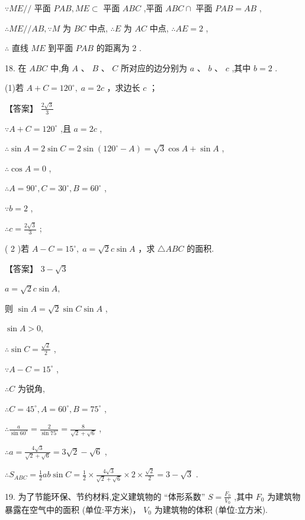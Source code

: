 \documentclass[10pt]{article}
\begin{document}
\(\because {ME}//\) 平面 \({PAB},{ME} \subset\) 平面 \({ABC}\) ,平面 \({ABC} \cap\) 平面 \({PAB} = {AB}\) ,

\(\therefore {ME}//{AB},\because M\) 为 \({BC}\) 中点, \(\therefore E\) 为 \({AC}\) 中点, \(\therefore {AE} = 2\) ,

\(\therefore\) 直线 \({ME}\) 到平面 \({PAB}\) 的距离为 2 .

18. 在 \({ABC}\) 中,角 \(A\text{ 、 }B\text{ 、 }C\) 所对应的边分别为 \(a\text{ 、 }b\text{ 、 }c\) ,其中 \(b = 2\) .

(1)若 \(A + C = {120}^{ \circ  },\;a = {2c}\) ，求边长 \(c\) ；

【答案】 \(\frac{2\sqrt{3}}{3}\)

\(\because A + C = {120}^{ \circ  }\) ,且 \(a = {2c}\) ,

\(\therefore \sin A = 2\sin C = 2\sin \left( {{120}^{ \circ  } - A}\right)  = \sqrt{3}\cos A + \sin A\) ,

\(\therefore \cos A = 0\) ,

\(\therefore A = {90}^{ \circ  },C = {30}^{ \circ  },B = {60}^{ \circ  }\) ,

\(\because b = 2\) ,

\(\therefore c = \frac{2\sqrt{3}}{3}\) ;

( 2 )若 \(A - C = {15}^{ \circ  },\;a = \sqrt{2}c\sin A\) ，求 \(\bigtriangleup  {ABC}\) 的面积.

【答案】 \(3 - \sqrt{3}\)

\(a = \sqrt{2}c\sin A,\)

则 \(\sin A = \sqrt{2}\sin C\sin A\) ,

\(\sin A > 0,\)

\(\therefore \sin C = \frac{\sqrt{2}}{2}\) ,

\(\because A - C = {15}^{ \circ  }\) ,

\(\therefore C\) 为锐角,

\(\therefore C = {45}^{ \circ  },A = {60}^{ \circ  },B = {75}^{ \circ  }\) ,

\(\therefore \frac{a}{\sin {60}^{ \circ  }} = \frac{2}{\sin {75}^{ \circ  }} = \frac{8}{\sqrt{2} + \sqrt{6}}\) ,

\(\therefore a = \frac{4\sqrt{3}}{\sqrt{2} + \sqrt{6}} = 3\sqrt{2} - \sqrt{6}\) ,

\(\therefore {S}_{ABC} = \frac{1}{2}{ab}\sin C = \frac{1}{2} \times  \frac{4\sqrt{3}}{\sqrt{2} + \sqrt{6}} \times  2 \times  \frac{\sqrt{2}}{2} = 3 - \sqrt{3}\) .

19. 为了节能环保、节约材料,定义建筑物的 “体形系数” \(S = \frac{{F}_{0}}{{V}_{0}}\) ,其中 \({F}_{0}\) 为建筑物暴露在空气中的面积 (单位:平方米)， \({V}_{0}\) 为建筑物的体积 (单位:立方米).
\end{document}

